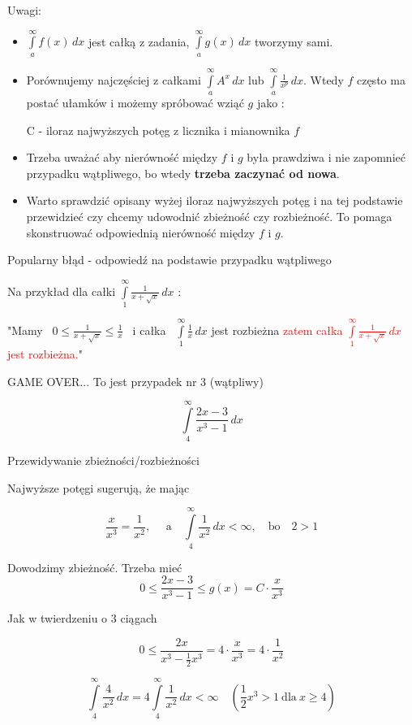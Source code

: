 Uwagi:

\begin{itemize}
    \item $ \int\limits_{a}^{\infty} f(x) \,dx $ jest całką z zadania, $ \int\limits_{a}^{\infty} g(x) \,dx $ tworzymy sami.
    \item Porównujemy najczęściej z całkami $ \int\limits_{a}^{\infty} A^x \,dx $ lub 
    $ \int\limits_{a}^{\infty} \frac{1}{x^p} \,dx $. Wtedy $f$ często ma postać ułamków i możemy spróbować
    wziąć $g$ jako :

    \quad C - iloraz najwyższych potęg z licznika i mianownika $f$

    \item Trzeba uważać aby nierówność między $f$ i $g$ była prawdziwa i nie zapomnieć przypadku wątpliwego, bo wtedy
    \textbf{trzeba zaczynać od nowa}.

    \item Warto sprawdzić opisany wyżej iloraz najwyższych potęg i na tej podstawie przewidzieć czy chcemy
    udowodnić zbieżność czy rozbieżność. To pomaga skonstruować odpowiednią nierówność między $f$ i $g$.
\end{itemize}

\begin{blad}{Popularny błąd - odpowiedź na podstawie przypadku wątpliwego}

Na przykład dla całki $ \int\limits_1^\infty \frac{1}{x + \sqrt{x}} \,dx $ : 

"Mamy \ $ 0 \leq \frac{1}{x + \sqrt{x}} \leq \frac{1}{x} $ \ i całka \ $ \int\limits_1^\infty \frac{1}{x} \,dx $
jest rozbieżna \textcolor{red}{zatem całka $ \int\limits_{1}^{\infty} \frac{1}{x + \sqrt{x}} \,dx $ jest rozbieżna.}"

GAME OVER... To jest przypadek nr 3 (wątpliwy) \\

\end{blad}

\begin{przyklad}

$$ \int\limits_4^\infty \frac{2x - 3}{x^3 - 1} \,dx $$

Przewidywanie zbieżności/rozbieżności

Najwyższe potęgi sugerują, że mając

$$ \frac{x}{x^3} = \frac{1}{x^2}, \quad \textrm{ a} \quad \int\limits_4^\infty \frac{1}{x^2} \,dx < \infty, \quad \textrm{bo} \quad 2 > 1 $$

Dowodzimy zbieżność. Trzeba mieć
$$ 0 \leq \frac{2x - 3}{x^3 - 1} \leq g(x) = C \cdot \frac{x}{x^3} $$

Jak w twierdzeniu o 3 ciągach

$$ 0 \leq \frac{2x}{x^3 - \frac{1}{2}x^3} = 4 \cdot \frac{x}{x^3} = 4 \cdot \frac{1}{x^2} $$

$$ \int\limits_4^\infty \frac{4}{x^2} \,dx = 4 \int\limits_4^\infty \frac{1}{x^2} \,dx < \infty
\quad \left(\frac{1}{2}x^3 > 1 \ \mathrm{dla} \ x \geq 4 \right) $$
\end{przyklad}



